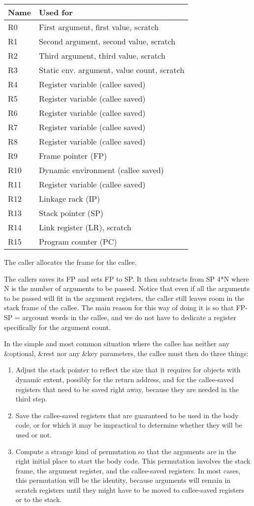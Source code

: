 \begin{tabular}{|l|l|}
\hline
Name & Used for\\
\hline
\hline
R0 & First argument, first value, scratch\\
R1 & Second argument, second value, scratch \\
R2 & Third argument, third value, scratch \\
R3 & Static env. argument, value count, scratch \\
R4 & Register variable (callee saved) \\
R5 & Register variable (callee saved) \\
R6 & Register variable (callee saved) \\
R7 & Register variable (callee saved) \\
R8 & Register variable (callee saved) \\
R9 & Frame pointer (FP) \\
R10 & Dynamic environment (callee saved) \\
R11 & Register variable (callee saved)\\
R12 & Linkage rack (IP)\\
R13 & Stack pointer (SP)\\
R14 & Link register (LR), scratch \\
R15 & Program counter (PC) \\
\hline
\end{tabular}

The caller allocates the frame for the callee. 

The callers saves its FP and sets FP to SP.  It then subtracts from SP
4*N where N is the number of arguments to be passed.  Notice that even
if all the arguments to be passed will fit in the argument registers,
the caller still leaves room in the stack frame of the callee.  The
main reason for this way of doing it is so that FP-SP = argcount words in
the callee, and we do not have to dedicate a register specifically for
the argument count.

In the simple and most common situation where the callee has neither
any \&optional, \&rest nor any \&key parameters, the callee must then
do three things:

\begin{enumerate}
\item Adjust the stack pointer to reflect the size that it requires
  for objects with dynamic extent, possibly for the return address,
  and for the callee-saved registers that need to be saved right
  away, because they are needed in the third step. 
\item Save the callee-saved registers that are guaranteed to be used
  in the body code, or for which it may be impractical to determine
  whether they will be used or not.  
\item Compute a strange kind of permutation so that the arguments are
  in the right initial place to start the body code.  This permutation
  involves the stack frame, the argument register, and the callee-saved
  registers.  In most cases, this permutation will be the identity,
  because arguments will remain in scratch registers until they might
  have to be moved to callee-saved registers or to the stack. 
\end{enumerate}

